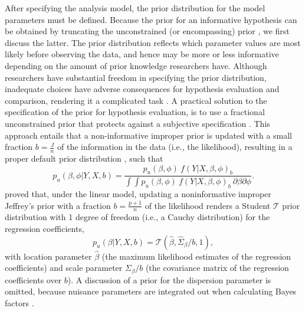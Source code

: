 \documentclass[review, 3p, authoryear]{elsarticle} %
\begin{document}
After specifying the analysis model, the prior distribution for the model parameters must be defined.
Because the prior for an informative hypothesis can be obtained by truncating the unconstrained (or encompassing) prior \citep[e.g.,][]{klugkist_inequality_2005}, we first discuss the latter.
The prior distribution reflects which parameter values are most likely before observing the data, and hence may be more or less informative depending on the amount of prior knowledge researchers have.
Although researchers have substantial freedom in specifying the prior distribution, inadequate choices have adverse consequences for hypothesis evaluation and comparison, rendering it a complicated task \citep{ohagan_fractional_1995}.
A practical solution to the specification of the prior for hypothesis evaluation, is to use a fractional unconstrained prior \citep{ohagan_fractional_1995} that protects against a subjective specification \citep{gu_approximated_2018}.
This approach entails that a non-informative improper prior is updated with a small fraction \(b = \frac{J}{n}\) of the information in the data (i.e., the likelihood), resulting in a proper default prior distribution \citep[e.g.,][]{mulder_equality_2010, gu_approximated_2018}, such that
\[
p_u(\beta, \phi|Y, X, b) = 
\frac{
  p_u(\beta, \phi) ~ f(Y|X, \beta, \phi)_b
}{
  \int \int p_u(\beta, \phi) ~ f(Y|X, \beta, \phi)_b ~ \partial \beta \partial \phi
}.
\]
\citet{mulder_olssoncollentine_2019} proved that, under the linear model, updating a noninformative improper Jeffrey's prior with a fraction \(b = \frac{p+1}{n}\) of the likelihood renders a Student \(\mathcal{T}\) prior distribution with 1 degree of freedom (i.e., a Cauchy distribution) for the regression coefficients,
\[
p_u(\beta | Y, X, b) = \mathcal{T}(\hat{\beta}, \hat{\Sigma}_\beta / b, 1),
\]
with location parameter \(\hat{\beta}\) (the maximum likelihood estimates of the regression coefficients) and scale parameter \(\Sigma_{\beta} / b\) (the covariance matrix of the regression coefficients over \(b\)). A discussion of a prior for the dispersion parameter is omitted, because nuisance parameters are integrated out when calculating Bayes factors \citep[e.g.,][]{gu_approximated_2018}.
\end{document}
